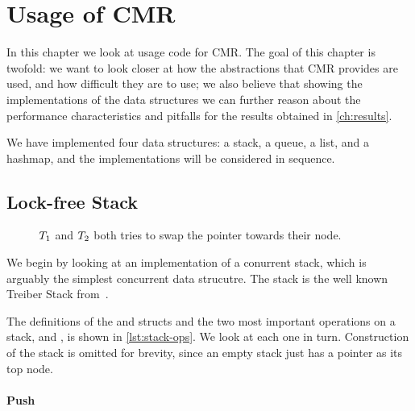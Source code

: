 \chapter{Usage of CMR\label{ch:usage}}

In this chapter we look at usage code for CMR\@. The goal of this chapter is twofold: we want to
look closer at how the abstractions that CMR provides are used, and how difficult they are to use;
we also believe that showing the implementations of the data structures we can further reason about
the performance characteristics and pitfalls for the results obtained in \cref{ch:results}.

We have implemented four data structures: a stack, a queue, a list, and a hashmap, and the
implementations will be considered in sequence.

\section{Lock-free Stack\label{sec:usage-stack}}

\begin{figure}[b]
\centering

\caption{$T\sb{1}$ and $T\sb{2}$ both tries to swap the  pointer towards their
node.}
\end{figure}

We begin by looking at an implementation of a conurrent stack, which is arguably the simplest
concurrent data strucutre. The stack is the well known Treiber Stack
from~\cite{treiber1986systems}.

The definitions of the  and  structs and the two most important operations
on a stack,  and , is shown in \cref{lst:stack-ops}. We look at each one in
turn. Construction of the stack is omitted for brevity, since an empty stack just has a 
pointer as its top node.

\begin{figure}[ht]

\end{figure}

\subsubsection{Push}

